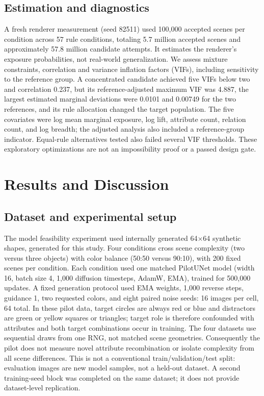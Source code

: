\documentclass{article}
\begin{document}
\subsection{Estimation and diagnostics}
A fresh renderer measurement (seed 82511) used 100,000 accepted scenes per condition across 57 rule conditions, totaling 5.7 million accepted scenes and approximately 57.8 million candidate attempts. It estimates the renderer's exposure probabilities, not real-world generalization. We assess mixture constraints, correlation and variance inflation factors (VIFs), including sensitivity to the reference group. A concentrated candidate achieved five VIFs below two and correlation 0.237, but its reference-adjusted maximum VIF was 4.887, the largest estimated marginal deviations were 0.0101 and 0.00749 for the two references, and its rule allocation changed the target population. The five covariates were log mean marginal exposure, log lift, attribute count, relation count, and log breadth; the adjusted analysis also included a reference-group indicator. Equal-rule alternatives tested also failed several VIF thresholds. These exploratory optimizations are not an impossibility proof or a passed design gate.
\section{Results and Discussion}
\subsection{Dataset and experimental setup}
The model feasibility experiment used internally generated 64$\times$64 synthetic shapes, generated for this study. Four conditions cross scene complexity (two versus three objects) with color balance (50:50 versus 90:10), with 200 fixed scenes per condition. Each condition used one matched PilotUNet model (width 16, batch size 4, 1,000 diffusion timesteps, AdamW, EMA), trained for 500,000 updates. A fixed generation protocol used EMA weights, 1,000 reverse steps, guidance 1, two requested colors, and eight paired noise seeds: 16 images per cell, 64 total. In these pilot data, target circles are always red or blue and distractors are green or yellow squares or triangles; target role is therefore confounded with attributes and both target combinations occur in training. The four datasets use sequential draws from one RNG, not matched scene geometries. Consequently the pilot does not measure novel attribute recombination or isolate complexity from all scene differences. This is not a conventional train/validation/test split: evaluation images are new model samples, not a held-out dataset. A second training-seed block was completed on the same dataset; it does not provide dataset-level replication.
\end{document}
